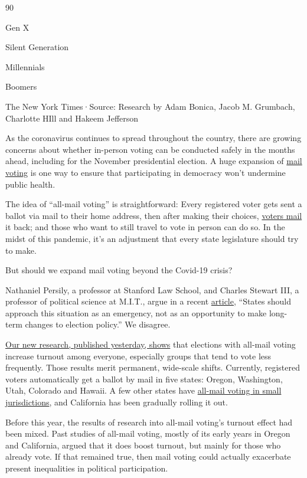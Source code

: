 90

Gen X

Silent Generation

Millennials

Boomers

The New York Times·Source: Research by Adam Bonica, Jacob M. Grumbach,
Charlotte HIll and Hakeem Jefferson

As the coronavirus continues to spread throughout the country, there are
growing concerns about whether in-person voting can be conducted safely
in the months ahead, including for the November presidential election. A
huge expansion of
\href{https://www.nytimes.com/2020/06/19/us/politics/nyc-vote-by-mail.html}{mail
voting} is one way to ensure that participating in democracy won't
undermine public health.

The idea of ``all-mail voting'' is straightforward: Every registered
voter gets sent a ballot via mail to their home address, then after
making their choices,
\href{https://www.nytimes.com/2020/05/25/us/vote-by-mail-coronavirus.html}{voters
mail} it back; and those who want to still travel to vote in person can
do so. In the midst of this pandemic, it's an adjustment that every
state legislature should try to make.

But should we expand mail voting beyond the Covid-19 crisis?

Nathaniel Persily, a professor at Stanford Law School, and Charles
Stewart III, a professor of political science at M.I.T., argue in a
recent
\href{https://www.lawfareblog.com/ten-recommendations-ensure-healthy-and-trustworthy-2020-election}{article},
``States should approach this situation as an emergency, not as an
opportunity to make long-term changes to election policy.'' We disagree.

\href{https://www.dropbox.com/s/8n4zjvgmytim1rv/Bonica_Grumbach_Hill_Jefferson_Mail_Voting.pdf?raw=1}{Our
new research, published yesterday, shows} that elections with all-mail
voting increase turnout among everyone, especially groups that tend to
vote less frequently. Those results merit permanent, wide-scale shifts.
Currently, registered voters automatically get a ballot by mail in five
states: Oregon, Washington, Utah, Colorado and Hawaii. A few other
states have
\href{https://www.ncsl.org/research/elections-and-campaigns/all-mail-elections.aspx}{all-mail
voting in small jurisdictions}, and California has been gradually
rolling it out.

Before this year, the results of research into all-mail voting's turnout
effect had been mixed. Past studies of all-mail voting, mostly of its
early years in Oregon and California, argued that it does boost turnout,
but mainly for those who already vote. If that remained true, then mail
voting could actually exacerbate present inequalities in political
participation.

